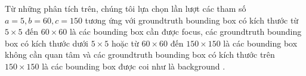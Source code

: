 {    \noindent
    Từ những phân tích trên, chúng tôi lựa chọn lần lượt các tham số $a = 5, b = 60, c = 150$ tương ứng với groundtruth  bounding box  có kích thước từ $5 \times 5$ đến $60 \times 60$ là các bounding box  cần được focus, các groundtruth  bounding box  có kích thước dưới $5 \times 5$ hoặc từ $60 \times 60$ đến $150 \times 150$ là các bounding box  không cần quan tâm và các groundtruth  bounding box  có kích thước trên $150 \times 150$ là các bounding box  được coi như là background .
}